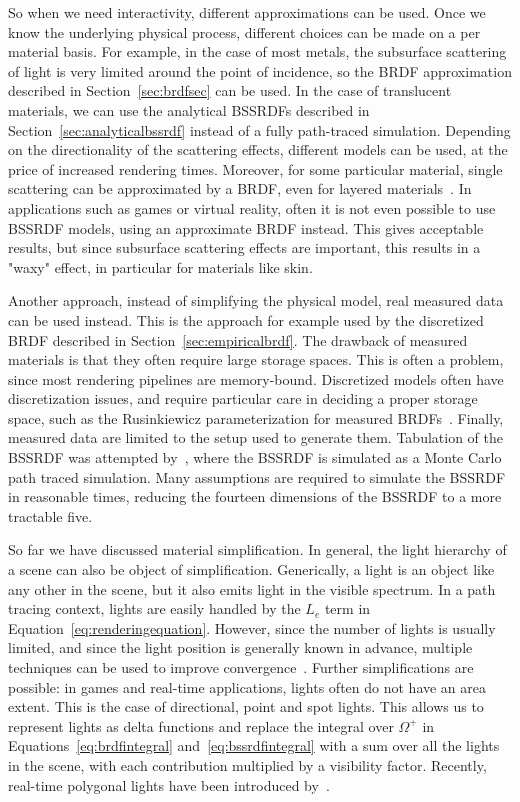 So when we need interactivity, different approximations can be used. Once we know the underlying physical process, different choices can be made on a per material basis. For example, in the case of most metals, the subsurface scattering of light is very limited around the point of incidence, so the BRDF approximation described in Section~\ref{sec:brdfsec} can be used. In the case of translucent materials, we can use the analytical BSSRDFs described in Section~\ref{sec:analyticalbssrdf} instead of a fully path-traced simulation. Depending on the directionality of the scattering effects, different models can be used, at the price of increased rendering times. Moreover, for some particular material, single scattering can be approximated by a BRDF, even for layered materials~\cite{Blinn1982, Hanrahan1993}. In applications such as games or virtual reality, often it is not even possible to use BSSRDF models, using an approximate BRDF instead. This gives acceptable results, but since subsurface scattering effects are important, this results in a "waxy" effect, in particular for materials like skin. 

Another approach, instead of simplifying the physical model, real measured data can be used instead. This is the approach for example used by the discretized BRDF described in Section~\ref{sec:empiricalbrdf}. The drawback of measured materials is that they often require large storage spaces. This is often a problem, since most rendering pipelines are memory-bound. Discretized models often have discretization issues, and require particular care in deciding a proper storage space, such as the Rusinkiewicz parameterization for measured BRDFs~\cite{Rusinkiewicz1998}. Finally, measured data are limited to the setup used to generate them. Tabulation of the BSSRDF was attempted by~\citet{Donner2009}, where the BSSRDF is simulated as a Monte Carlo path traced simulation. Many assumptions are required to simulate the BSSRDF in reasonable times, reducing the fourteen dimensions of the BSSRDF to a more tractable five.  

So far we have discussed material simplification. In general, the light hierarchy of a scene can also be object of simplification. Generically, a light is an object like any other in the scene, but it also emits light in the visible spectrum. In a path tracing context, lights are easily handled by the $L_e$ term in Equation~\ref{eq:renderingequation}. However, since the number of lights is usually limited, and since the light position is generally known in advance, multiple techniques can be used to improve convergence~\cite{Shirley1996}. Further simplifications are possible: in games and real-time applications, lights often do not have an area extent. This is the case of directional, point and spot lights. This allows us to represent lights as delta functions and replace the integral over $\Omega^+$ in Equations~\ref{eq:brdfintegral} and~\ref{eq:bssrdfintegral} with a sum over all the lights in the scene, with each contribution multiplied by a visibility factor. Recently, real-time polygonal lights have been introduced by~\citet{Heitz2016}.

